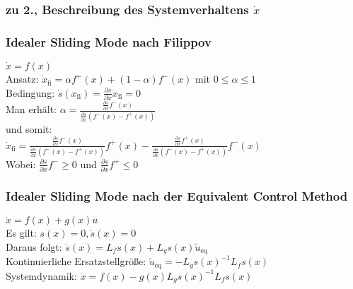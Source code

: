 \documentclass[6pt,a4paper,fleqn]{scrartcl}
\begin{document}
\begin{multicols*}{4}
\subsubsection*{zu 2., Beschreibung des Systemverhaltens $\dot{x}$}

\subsubsection*{Idealer Sliding Mode nach Filippov}
$\dot{x} = f(x)$\\
Ansatz: $\dot{x}_\text{fi} = \alpha f^+(x) + (1-\alpha) f^-(x)$ mit $0 \leq \alpha \leq 1$ \\
Bedingung: $\dot{s}(x_\text{fi}) = \frac{\partial s}{\partial x} \dot{x}_\text{fi} = 0$ \\
Man erhält: $\alpha = \frac{ \frac{\partial s}{\partial x} f^-(x)  }{ \frac{\partial s}{\partial x} (f^-(x) - f^+(x))  }$ \\
und somit:\\ $\dot{x}_\text{fi} = \frac{ \frac{\partial s}{\partial x} f^-(x)  }{ \frac{\partial s}{\partial x} (f^-(x) - f^+(x)) } f^+(x) - 
\frac{ \frac{\partial s}{\partial x} f^+(x)  }{ \frac{\partial s}{\partial x} (f^-(x) - f^+(x)) } f^-(x)$ \\
Wobei: $\frac{\partial s}{\partial x}f^- \geq 0$ und $\frac{\partial s}{\partial x}f^+ \leq 0$ \\

\subsubsection*{Idealer Sliding Mode nach der Equivalent Control Method}
$\dot{x} = f(x) + g(x)u$ \\
Es gilt: $s(x) = 0, \dot{s}(x) = 0$ \\
Daraus folgt: $\dot{s}(x) = L_f s(x) + L_g s(x) \tilde{u}_\text{eq}$ \\
Kontinuierliche Ersatzstellgröße: $\tilde{u}_\text{eq} = -L_g s(x) ^{-1} L_f s(x)$ \\
Systemdynamik: $\dot{x} = f(x) - g(x) L_g s(x)^{-1} L_f s(x)$

































\end{multicols*}


\end{document}

